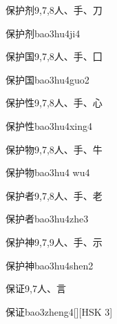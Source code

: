 \begin{Entry}{保护剂}{9,7,8}{⼈、⼿、⼑}
  \begin{Phonetics}{保护剂}{bao3hu4ji4}
  \end{Phonetics}
\end{Entry}

\begin{Entry}{保护国}{9,7,8}{⼈、⼿、⼞}
  \begin{Phonetics}{保护国}{bao3hu4guo2}
  \end{Phonetics}
\end{Entry}

\begin{Entry}{保护性}{9,7,8}{⼈、⼿、⼼}
  \begin{Phonetics}{保护性}{bao3hu4xing4}
  \end{Phonetics}
\end{Entry}

\begin{Entry}{保护物}{9,7,8}{⼈、⼿、⽜}
  \begin{Phonetics}{保护物}{bao3hu4 wu4}
  \end{Phonetics}
\end{Entry}

\begin{Entry}{保护者}{9,7,8}{⼈、⼿、⽼}
  \begin{Phonetics}{保护者}{bao3hu4zhe3}
  \end{Phonetics}
\end{Entry}

\begin{Entry}{保护神}{9,7,9}{⼈、⼿、⽰}
  \begin{Phonetics}{保护神}{bao3hu4shen2}
  \end{Phonetics}
\end{Entry}

\begin{Entry}{保证}{9,7}{⼈、⾔}
  \begin{Phonetics}{保证}{bao3zheng4}[][HSK 3]
  \end{Phonetics}
\end{Entry}

